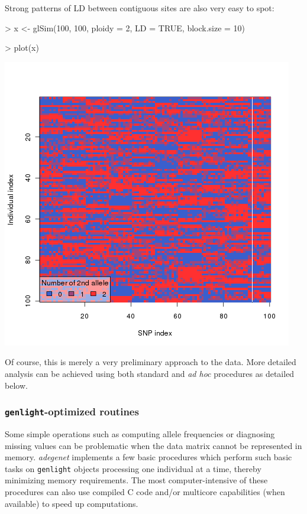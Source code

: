 \documentclass{article}
\begin{document}
Strong patterns of LD between contiguous sites are also very easy to spot:
\begin{Schunk}
\begin{Sinput}
> x <- glSim(100, 100, ploidy = 2, LD = TRUE, block.size = 10)
\end{Sinput}
\end{Schunk}
\begin{Schunk}
\begin{Sinput}
> plot(x)
\end{Sinput}
\end{Schunk}
\begin{center}
  \includegraphics{figs/glsim2}
\end{center}

Of course, this is merely a very preliminary approach to the data.
More detailed analysis can be achieved using both standard and \textit{ad hoc} procedures as
detailed below.



\subsubsection{\texttt{genlight}-optimized routines}


Some simple operations such as computing allele frequencies or diagnosing missing values can be
problematic when the data matrix cannot be represented in memory.
\textit{adegenet} implements a few basic procedures which perform such basic tasks on
\texttt{genlight} objects processing one individual at a time, thereby minimizing memory
requirements. The most computer-intensive of these procedures can also use compiled C code and/or
multicore capabilities (when available) to speed up computations.
\\
\end{document}
